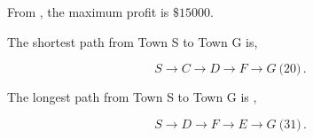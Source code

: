 \begin{subquestions}
\begin{subsubquestions}
\begin{subsubsubquestions}
From , the maximum profit is $\$ 15000$.

\end{subsubsubquestions}

\end{subsubquestions}


\subquestion

The shortest path from Town S to Town G is,

\begin{equation}
	S \rightarrow C \rightarrow D \rightarrow F \rightarrow G ~\text{(20)} \,.
\end{equation}

The longest path from Town S to Town G is ,

\begin{equation}
	S \rightarrow D \rightarrow F \rightarrow E \rightarrow G ~\text{(31)} \,.
\end{equation}

\end{subquestions}

